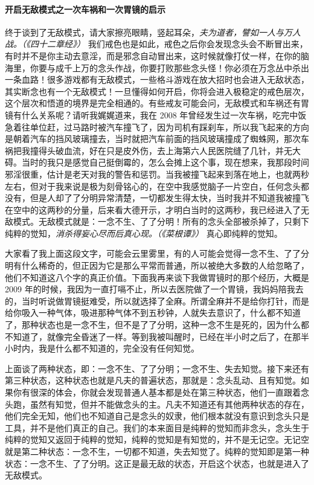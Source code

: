 \paragraph{开启无敌模式之一次车祸和一次胃镜的启示}

终于谈到了无敌模式，请大家擦亮眼睛，竖起耳朵，\textit{夫为道者，譬如一人与万人战。（《四十二章经》）} 我们戒色也是如此，戒色之后你会发现念头会不断冒出来，有时并不是你主动去意淫，而是邪念自动冒出来，这时候就像打仗一样，在你的脑海里，你要与成千上万的念头作战，你要打败那些念头怪！你必须在万念丛中杀出一条血路！很多游戏都有无敌模式，一些格斗游戏在放大招时也会进入无敌状态，其实断念也有一个无敌模式！一旦懂得如何开启，你将会进入极稳定的戒色层次，这个层次和悟道的境界是完全相通的。有些戒友可能会问，无敌模式和车祸还有胃镜有什么关系呢？请听我娓娓道来，我在 2008 年曾经发生过一次车祸，吃完中饭急着往单位赶，过马路时被汽车撞飞了，因为司机有踩刹车，所以我飞起来的方向是朝着汽车的挡风玻璃撞去，当时就把汽车前面的挡风玻璃撞成了蜘蛛网，那次车祸把我撞得头破血流，好在只是皮外伤，去上海第六人民医院缝了几针，并无大碍。当时的我只是感觉自己挺倒霉的，怎么会摊上这个事，现在想来，我那段时间邪淫很重，估计是老天对我的警告和惩罚。当我被撞飞起来到落在地上，也就两秒左右，但对于我来说是极为刻骨铭心的，在空中我感觉脑子一片空白，任何念头都没有，但是人却了了分明异常清楚，一切都发生得太快，当时我并不知道我被撞飞在空中的这两秒的分量，后来看大德开示，才明白当时的这两秒，我已经进入了无敌模式。无敌模式就是：一念不生、了了分明！所有的念头全部被杀掉了，只剩下纯粹的觉知，\textit{消杀得妄心尽而后真心现。（《菜根谭》）} 真心即纯粹的觉知。

大家看了我上面这段文字，可能会云里雾里，有的人可能会觉得一念不生、了了分明有什么稀奇的，但正因为它是那么平常而普通，所以被绝大多数的人给忽略了，他们不知道这八个字的真正价值。下面我再来谈下我做胃镜时的那个经历，大概是 2009 年的时候，我因为一直打嗝不止，所以去医院做了一个胃镜，我妈妈陪我去的，当时听说做胃镜挺难受，所以就选择了全麻。所谓全麻并不是给你打针，而是给你吸入一种气体，吸进那种气体不到五秒钟，人就失去意识了，什么都不知道了，那种状态也是一念不生，但不是了了分明，这种一念不生是死的，因为什么都不知道了，就像完全昏迷了一样。等到我被叫醒时，已经在半小时之后了，在那半小时内，我是什么都不知道的，完全没有任何知觉。

上面谈了两种状态，即：一念不生、了了分明；一念不生、失去知觉。接下来还有第三种状态，这种状态也就是凡夫的普遍状态，那就是：念头乱动、且有知觉。如果你有很深的体会，你就会发现普通人基本都是处在第三种状态，他们一直跟着念头跑，虽然有知觉，但并不能做念头的主。凡夫不知道还有其他两种状态的存在，他们完全无知，他们也不知道自己是念头的奴隶，他们根本就没有意识到念头只是工具，并不是他们真正的自己。我们的本来面目是纯粹的觉知而非念头，念头生于纯粹的觉知又返回于纯粹的觉知，纯粹的觉知是有知觉的，并不是无记空。无记空就是第二种状态：一念不生，一切都不知道，失去知觉了。纯粹的觉知即是第一种状态：一念不生、了了分明。这正是最无敌的状态，开启这个状态，也就是进入了无敌模式。

